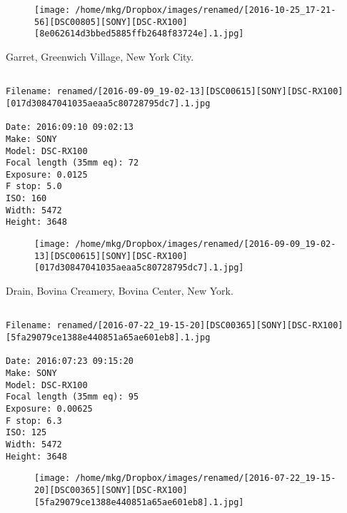 \begin{figure}
\texttt{[image: /home/mkg/Dropbox/images/renamed/[2016-10-25\_17-21-56][DSC00805][SONY][DSC-RX100][8e062614d3bbed5885ffb2648f83724e].1.jpg]}
\end{figure}
    
\clearpage
\onecolumn
\noindent Garret, Greenwich Village, New York City.
\noindent
\begin{lstlisting}

Filename: renamed/[2016-09-09_19-02-13][DSC00615][SONY][DSC-RX100][017d30847041035aeaa5c80728795dc7].1.jpg

Date: 2016:09:10 09:02:13
Make: SONY
Model: DSC-RX100
Focal length (35mm eq): 72
Exposure: 0.0125
F stop: 5.0
ISO: 160
Width: 5472
Height: 3648
\end{lstlisting}
\clearpage

\begin{figure}
\texttt{[image: /home/mkg/Dropbox/images/renamed/[2016-09-09\_19-02-13][DSC00615][SONY][DSC-RX100][017d30847041035aeaa5c80728795dc7].1.jpg]}
\end{figure}
    
\clearpage
\onecolumn
\noindent Drain, Bovina Creamery, Bovina Center, New York.
\noindent
\begin{lstlisting}

Filename: renamed/[2016-07-22_19-15-20][DSC00365][SONY][DSC-RX100][5fa29079ce1388e440851a65ae601eb8].1.jpg

Date: 2016:07:23 09:15:20
Make: SONY
Model: DSC-RX100
Focal length (35mm eq): 95
Exposure: 0.00625
F stop: 6.3
ISO: 125
Width: 5472
Height: 3648
\end{lstlisting}
\clearpage

\begin{figure}
\texttt{[image: /home/mkg/Dropbox/images/renamed/[2016-07-22\_19-15-20][DSC00365][SONY][DSC-RX100][5fa29079ce1388e440851a65ae601eb8].1.jpg]}
\end{figure}
    

